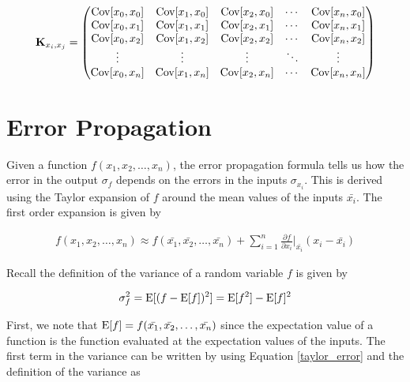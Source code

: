 \begin{align}
\textbf{K}_{x_i,x_j} = \begin{pmatrix} 
                             \mathrm{Cov}[x_0,x_0]&\mathrm{Cov}[x_1,x_0]&\mathrm{Cov}[x_2,x_0]&\cdots &\mathrm{Cov}[x_n,x_0]\\
                             \mathrm{Cov}[x_0,x_1]&\mathrm{Cov}[x_1,x_1]&\mathrm{Cov}[x_2,x_1]&\cdots &\mathrm{Cov}[x_n,x_1]\\
                             \mathrm{Cov}[x_0,x_2]&\mathrm{Cov}[x_1,x_2]&\mathrm{Cov}[x_2,x_2]&\cdots &\mathrm{Cov}[x_n,x_2]\\
                             \vdots&\vdots&\vdots&\ddots&\vdots\\
                             \mathrm{Cov}[x_0,x_n]&\mathrm{Cov}[x_1,x_n]&\mathrm{Cov}[x_2,x_n]&\cdots &\mathrm{Cov}[x_n,x_n] \end{pmatrix}
\end{align}


\section{Error Propagation}

Given a function $f(x_1, x_2, \dots, x_n)$, the error propagation formula tells us how the error in the output $\sigma_f$ depends on the errors in the inputs $\sigma_{x_i}$. This
is derived using the Taylor expansion of $f$ around the mean values of the inputs $\bar{x_i}$. The first order expansion is given by

\begin{align}\label{taylor_error}
f(x_1, x_2, \dots, x_n) \approx f(\bar{x_1}, \bar{x_2}, \dots, \bar{x_n}) + \sum_{i=1}^n \frac{\partial f}{\partial x_i}\Bigg|_{\bar{x_i}}(x_i-\bar{x_i})
\end{align}

Recall the definition of the variance of a random variable $f$ is given by

\begin{align}
\sigma_f^2 = \mathrm{E}[(f-\mathrm{E}[f])^2] = \mathrm{E}[f^2] - \mathrm{E}[f]^2
\end{align}


First, we note that $\mathrm{E}[f] = f(\bar{x_1}, \bar{x_2}, \dots, \bar{x_n})$ since the expectation value of a function is the function evaluated at the expectation values of the inputs.
The first term in the variance can be written by using Equation \ref{taylor_error} and the definition of the variance as

